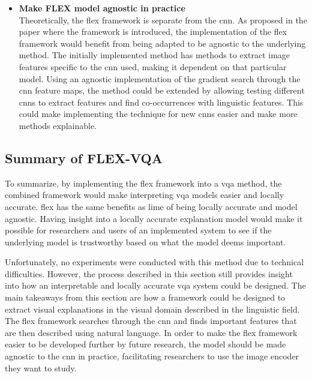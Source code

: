 \begin{itemize}
                \item \textbf{Make FLEX model agnostic in practice\\}
                Theoretically, the \gls{flex} framework is separate from the \gls{cnn}. As proposed in the paper where the framework is introduced, the implementation of the \gls{flex} framework would benefit from being adapted to be agnostic to the underlying method. The initially implemented method has methods to extract image features specific to the \gls{cnn} used, making it dependent on that particular model. Using an agnostic implementation of the gradient search through the \gls{cnn} feature maps, the method could be extended by allowing testing different \glspl{cnn} to extract features and find co-occurrences with linguistic features. This could make implementing the technique for new \glspl{cnn} easier and make more methods explainable. 

            \end{itemize}

        \subsection{Summary of FLEX-VQA}
        To summarize, by implementing the \gls{flex} framework into a \gls{vqa} method, the combined framework would make interpreting \gls{vqa} models easier and locally accurate. \gls{flex} has the same benefits as \gls{lime} of being locally accurate and model agnostic. Having insight into a locally accurate explanation model would make it possible for researchers and users of an implemented system to see if the underlying model is trustworthy based on what the model deems important. 

        Unfortunately, no experiments were conducted with this method due to technical difficulties. However, the process described in this section still provides insight into how an interpretable and locally accurate \gls{vqa} system could be designed. 
        The main takeaways from this section are how a framework could be designed to extract visual explanations in the visual domain described in the linguistic field. The \gls{flex} framework searches through the \gls{cnn} and finds important features that are then described using natural language. In order to make the \gls{flex} framework easier to be  developed further by future research, the model should be made agnostic to the \gls{cnn} in practice, facilitating researchers to use the image encoder they want to study. 

